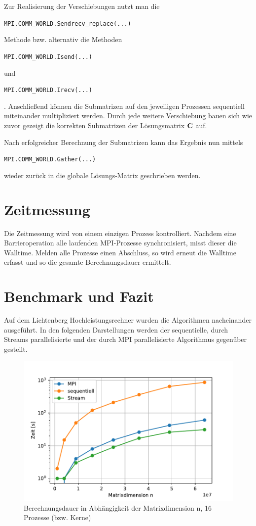 \documentclass[
ngerman,
ruledheaders=section,
class=report,
thesis={type=Dokumentation},
ignore-missing-data=true,
accentcolor=9c,
custommargins=false,
marginpar=false,
parskip=half-,
fontsize=11pt,
]{tudapub}
\let\code\texttt
\def\code#1{\begin{small}\texttt{#1}\end{small}}
\begin{document}
	Zur Realisierung der Verschiebungen nutzt man die \code{MPI.COMM\_WORLD.Sendrecv\_replace(...)} Methode bzw. alternativ die Methoden \code{MPI.COMM\_WORLD.Isend(...)} und \code{MPI.COMM\_WORLD.Irecv(...)}. Anschließend können die Submatrizen auf den jeweiligen Prozessen sequentiell miteinander multipliziert werden. Durch jede weitere Verschiebung bauen sich wie zuvor gezeigt die korrekten Submatrizen der Lösungsmatrix $\text{\textbf{C}}$ auf.
	
	Nach erfolgreicher Berechnung der Submatrizen kann das Ergebnis nun mittels \code{MPI.COMM\_WORLD.Gather(...)} wieder zurück in die globale Lösungs-Matrix geschrieben werden.
	
	\chapter{Zeitmessung}
	Die Zeitmessung wird von einem einzigen Prozess kontrolliert. Nachdem eine Barrieroperation alle laufenden MPI-Prozesse synchronisiert, misst dieser die Walltime. Melden alle Prozesse einen Abschluss, so wird erneut die Walltime erfasst und so die gesamte Berechnungsdauer ermittelt.
	
	\chapter{Benchmark und Fazit}	
	Auf dem Lichtenberg Hochleistungsrechner wurden die Algorithmen nacheinander ausgeführt. In den folgenden Darstellungen werden der sequentielle, durch Streams parallelisierte und der durch MPI parallelisierte Algorithmus gegenüber gestellt.
	
	\begin{figure}[H]
		\centering
		\includegraphics[width=0.7\linewidth]{content/16_procs_25000000}
		\caption{Berechnungsdauer in Abhängigkeit der Matrixdimension n, 16 Prozesse (bzw. Kerne)}
		\label{fig:16procs25000000}
	\end{figure}
	
\end{document}
